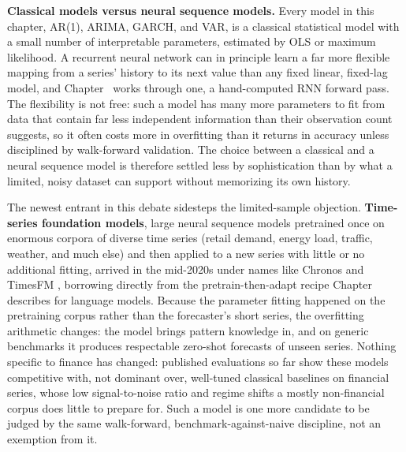 \documentclass[../ai_in_finance]{subfiles}
\begin{document}
\textbf{Classical models versus neural sequence models.} Every model in this chapter, AR(1), ARIMA, GARCH, and VAR, is a classical statistical model with a small number of interpretable parameters, estimated by OLS or maximum likelihood. A recurrent neural network can in principle learn a far more flexible mapping from a series' history to its next value than any fixed linear, fixed-lag model, and Chapter~ works through one, a hand-computed RNN forward pass.
The flexibility is not free: such a model has many more parameters to fit from data that contain far less independent information than their observation count suggests, so it often costs more in overfitting than it returns in accuracy unless disciplined by walk-forward validation.
The choice between a classical and a neural sequence model is therefore settled less by sophistication than by what a limited, noisy dataset can support without memorizing its own history.

The newest entrant in this debate sidesteps the limited-sample objection. \textbf{Time-series foundation models}, large neural sequence models pretrained once on enormous corpora of diverse time series (retail demand, energy load, traffic, weather, and much else) and then applied to a new series with little or no additional fitting, arrived in the mid-2020s under names like Chronos \parencite{ansari2024chronos} and TimesFM \parencite{das2024decoder}, borrowing directly from the pretrain-then-adapt recipe Chapter~ describes for language models. Because the parameter fitting happened on the pretraining corpus rather than the forecaster's short series, the overfitting arithmetic changes: the model brings pattern knowledge in, and on generic benchmarks it produces respectable zero-shot forecasts of unseen series. Nothing specific to finance has changed: published evaluations so far show these models competitive with, not dominant over, well-tuned classical baselines on financial series, whose low signal-to-noise ratio and regime shifts a mostly non-financial corpus does little to prepare for. Such a model is one more candidate to be judged by the same walk-forward, benchmark-against-naive discipline, not an exemption from it.
\end{document}
